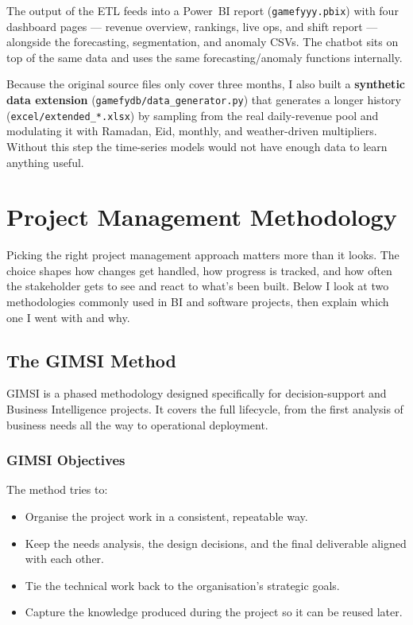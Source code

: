 \documentclass[12pt, a4paper]{report}
\begin{document}
The output of the ETL feeds into a Power~BI report (\texttt{gamefyyy.pbix})
with four dashboard pages — revenue overview, rankings, live ops, and shift
report — alongside the forecasting, segmentation, and anomaly CSVs. The
chatbot sits on top of the same data and uses the same forecasting/anomaly
functions internally.

Because the original source files only cover three months, I also built a
\textbf{synthetic data extension} (\texttt{gamefydb/data\_generator.py}) that
generates a longer history (\texttt{excel/extended\_*.xlsx}) by sampling from
the real daily-revenue pool and modulating it with Ramadan, Eid, monthly,
and weather-driven multipliers. Without this step the time-series models would
not have enough data to learn anything useful.

\section{Project Management Methodology}

Picking the right project management approach matters more than it looks. The
choice shapes how changes get handled, how progress is tracked, and how often
the stakeholder gets to see and react to what's been built. Below I look at
two methodologies commonly used in BI and software projects, then explain
which one I went with and why.

\subsection{The GIMSI Method}

GIMSI is a phased methodology designed specifically for decision-support and
Business Intelligence projects. It covers the full lifecycle, from the first
analysis of business needs all the way to operational deployment.

\subsubsection{GIMSI Objectives}

The method tries to:

\begin{itemize}[noitemsep]
  \item Organise the project work in a consistent, repeatable way.
  \item Keep the needs analysis, the design decisions, and the final deliverable
        aligned with each other.
  \item Tie the technical work back to the organisation's strategic goals.
  \item Capture the knowledge produced during the project so it can be reused
        later.
\end{itemize}
\end{document}
